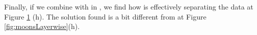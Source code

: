 \begin{figure}
{{    %
    }
    \parbox{.195\textwidth}{%
    }
  }

    \caption{\SepUnitPoint}
    \label{fig:moonsUnitpointwise}
\end{figure}

Finally, if we combine \SepPoint with \SepPoint in \SepUnitPoint, we find how is effectively separating the data at Figure \ref{fig:moonsUnitpointwise} (h). The solution found is a bit different from \SepLayer at Figure \ref{fig:moonsLayerwise}(h).

